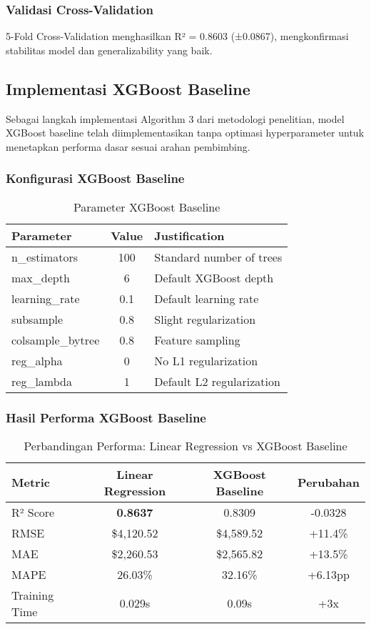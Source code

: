 \subsubsection{Validasi Cross-Validation}
5-Fold Cross-Validation menghasilkan R² = 0.8603 (±0.0867), mengkonfirmasi stabilitas model dan generalizability yang baik.

\subsection{Implementasi XGBoost Baseline}
\label{subsec:xgboost-baseline}

Sebagai langkah implementasi Algorithm 3 dari metodologi penelitian, model XGBoost baseline telah diimplementasikan tanpa optimasi hyperparameter untuk menetapkan performa dasar sesuai arahan pembimbing.

\subsubsection{Konfigurasi XGBoost Baseline}
\begin{table}[H]
\centering
\caption{Parameter XGBoost Baseline}
\label{tab:xgboost-baseline-params}
\begin{tabular}{|l|c|l|}
\hline
\textbf{Parameter} & \textbf{Value} & \textbf{Justification} \\
\hline
n\_estimators & 100 & Standard number of trees \\
max\_depth & 6 & Default XGBoost depth \\
learning\_rate & 0.1 & Default learning rate \\
subsample & 0.8 & Slight regularization \\
colsample\_bytree & 0.8 & Feature sampling \\
reg\_alpha & 0 & No L1 regularization \\
reg\_lambda & 1 & Default L2 regularization \\
\hline
\end{tabular}
\end{table}

\subsubsection{Hasil Performa XGBoost Baseline}
\begin{table}[H]
\centering
\caption{Perbandingan Performa: Linear Regression vs XGBoost Baseline}
\label{tab:baseline-comparison}
\begin{tabular}{|l|c|c|c|}
\hline
\textbf{Metric} & \textbf{Linear Regression} & \textbf{XGBoost Baseline} & \textbf{Perubahan} \\
\hline
R² Score & \textbf{0.8637} & 0.8309 & -0.0328 \\
RMSE & \$4,120.52 & \$4,589.52 & +11.4\% \\
MAE & \$2,260.53 & \$2,565.82 & +13.5\% \\
MAPE & 26.03\% & 32.16\% & +6.13pp \\
Training Time & 0.029s & 0.09s & +3x \\
\hline
\end{tabular}
\end{table}

